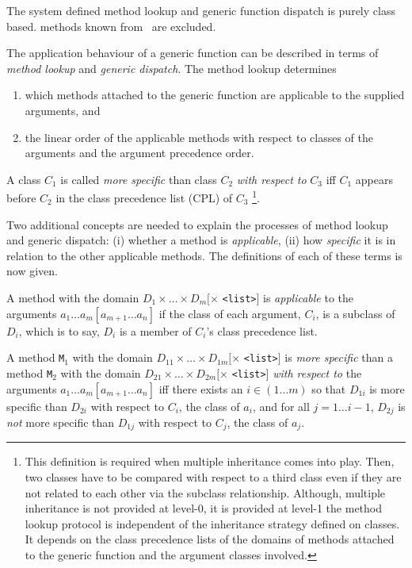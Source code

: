 \begin{optDefinition}
The system defined  method lookup and generic function dispatch is purely
class based.  methods known from \clos\ are excluded.

The application behaviour of a generic function can be described in terms
of {\em method lookup\/} and {\em generic dispatch}. The method lookup
determines
\begin{enumerate}
        \item  which methods attached to the generic function are applicable
    to the supplied arguments, and

        \item  the linear order of the applicable methods with respect to
        classes of the  arguments and the argument precedence order.
\end{enumerate}

A class $C_1$ is called {\em more specific\/} than class $C_2$ {\em with respect
    to\/} $C_3$ iff $C_1$ appears before $C_2$ in the class precedence list
(CPL) of $C_3$
%
\footnote%
{%
    This definition is required when multiple
    inheritance comes into play. Then, two classes have to be compared with
    respect to a third class even if they are not related to each other via the
    subclass relationship.  Although, multiple inheritance is not provided at
    level-0, it is provided at level-1 the method lookup protocol is independent
    of the inheritance strategy defined on classes. It depends on the class
    precedence lists of the domains of methods attached to the generic function
    and the argument classes involved.%
}.

Two additional concepts are needed to explain the processes of method
lookup and generic dispatch: (i) whether a method is {\em applicable},
(ii) how {\em specific} it is in relation to the other applicable
methods.  The definitions of each of these terms is now given.

A method with the domain $D_1 \times \ldots \times D_m [\times$
\verb|<list>|$]$ is {\em applicable\/} to the arguments $a_1 \ldots a_m
[a_{m+1} \ldots a_n]$ if the class of each argument, $C_i$, is a
subclass of $D_i$, which is to say, $D_i$ is a member of $C_i$'s class
precedence list.

A method {\tt M$_{1}$} with the domain $D_{11} \times \ldots \times
D_{1m} [\times$ \verb|<list>|$]$ is {\em more specific\/} than a method
{\tt M$_{2}$} with the domain $D_{21} \times \ldots \times D_{2m}
[\times$ \verb|<list>|$]$ {\em with respect to} the arguments $a_1
\ldots a_m [a_{m+1} \ldots a_n]$ iff there exists an $i\in (1 \ldots
m)$ so that $D_{1i}$ is more specific than $D_{2i}$ with respect to
$C_i$, the class of $a_i$, and for all $j=1 \ldots i-1$, $D_{2j}$ is
{\em not} more specific than $D_{1j}$ with respect to $C_j$, the class
of $a_j$.


\end{optDefinition}

